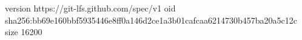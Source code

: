 version https://git-lfs.github.com/spec/v1
oid sha256:bb69e160bbf5935446e8ff0a146d2ce1a3b01cafcaa6214730b457ba20a5c12c
size 16200
